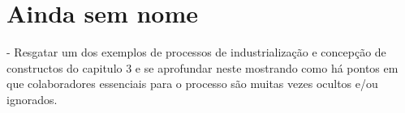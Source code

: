 \chapter{Ainda sem nome}\label{cap:cap5}

- Resgatar um dos exemplos de processos de industrialização e concepção de constructos do capitulo 3 e se aprofundar neste mostrando como há pontos em que colaboradores essenciais para o processo são muitas vezes ocultos e/ou ignorados.